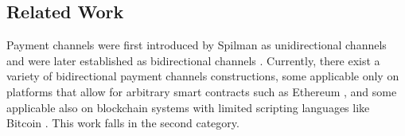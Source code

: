 \documentclass[runningheads]{llncs}
\newcommand{\authnote}[3]{{ \footnotesize \bf{#1[#2: #3]~}}} %
\newcommand{\edit}[1]{\authnote{\color{blue}}{edit}{#1}}
\newcommand{\sys}{\textsc{Cerberus}\xspace}
\begin{document}

\subsection{Related Work}
\label{sec:related}
Payment channels were first introduced by Spilman \cite{spilman2013channels} as unidirectional channels and were later established as bidirectional channels \cite{poon2015lightning,decker15fast}. Currently, there exist a variety of bidirectional payment channels constructions, some applicable only on platforms that allow for arbitrary smart contracts such as Ethereum \cite{dziembowski2017perun,Miller2017sprites,green2017bolt,avarikioti2019brick}, and some applicable also on blockchain systems with limited scripting languages like Bitcoin \cite{poon2015lightning,deckereltoo,decker15fast,avarikioti2018watchtowers}. This work falls in the second category.
\end{document}
